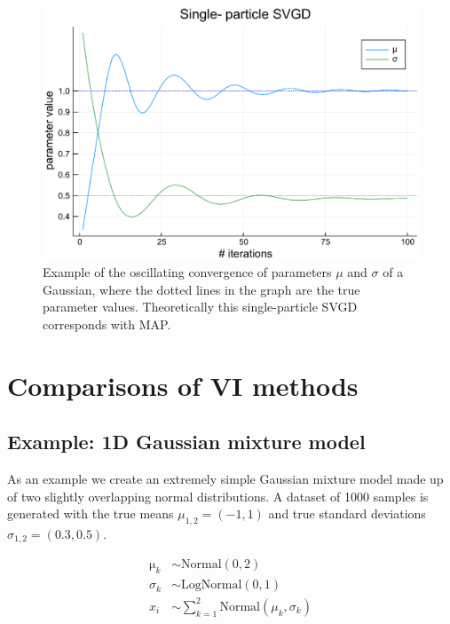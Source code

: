 \begin{figure}
	\centering
	\includegraphics[width=5in]{images/svgd-map.eps}
	\caption[SVGD single-particle example graph.]{Example of the oscillating convergence of parameters $\mu$ and $\sigma$ of a Gaussian, where the dotted lines in the graph are the true parameter values. Theoretically this single-particle SVGD corresponds with MAP.}
    \label{fig:svgd-opt}
\end{figure}


\section{Comparisons of VI methods}

\subsection{Example: 1D Gaussian mixture model}
As an example we create an extremely simple Gaussian mixture model made up of two slightly overlapping normal distributions. A dataset of 1000 samples is generated with the true means $\mu_{1, 2} = (-1, 1)$ and true standard deviations $\sigma_{1, 2} = (0.3, 0.5)$.

\begin{equation}
    \begin{split}
        \mathrm{\mu}_k & \sim \mathrm{Normal}(0, 2) \\
        \sigma_k & \sim \mathrm{LogNormal}(0, 1) \\
        x_i & \sim \sum^2_{k=1} \mathrm{Normal}(\mu_k, \sigma_k) \\
    \end{split}
\end{equation}

